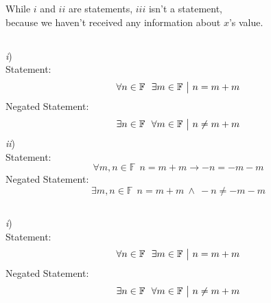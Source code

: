 \documentclass[a4paper, 12pt]{article}
\newcommand{\sub}[1]{\subsection{\underline{#1}}}
\newcommand{\?}{\stackrel{?}{=}}
\newcommand{\F}{\ensuremath{\mathbb{F}}}
\begin{document}
\begin{titlepage}
\end{titlepage}

\section{}
\sub{}
While $i$ and $ii$ are statements, $iii$ isn't a statement,\\
because we haven't received any information about $x$'s value.
\sub{}
    \textit{i})\\
        Statement: $$ \forall{n}\in{\F} ~~ \exists{m}\in{\F} ~\big{|}~ n=m+m $$
        Negated Statement: $$ \exists{n}\in{\F} ~~ \forall{m}\in{\F} ~\big{|}~ n\neq m+m $$
    \textit{ii})\\
        Statement: $$ \forall{m,n}\in{\F} ~~ n=m+m \rightarrow -n=-m-m $$
        Negated Statement: $$ \exists{m,n}\in{\F} ~~ n=m+m ~\land~ -n\neq-m-m $$
\sub{}
    \textit{i})\\
        Statement: $$ \forall{n}\in{\F} ~~ \exists{m}\in{\F} ~\big{|}~ n=m+m $$
        Negated Statement: $$ \exists{n}\in{\F} ~~ \forall{m}\in{\F} ~\big{|}~ n\neq m+m $$


\end{document}
